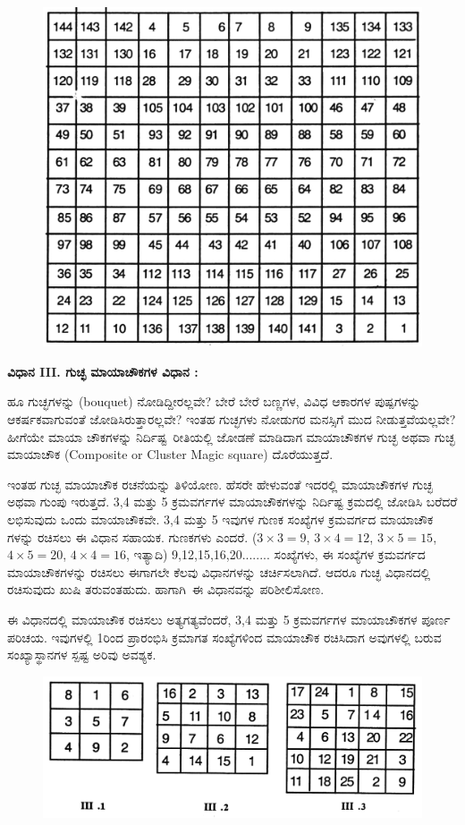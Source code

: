 \begin{figure}[H]
\includegraphics{src/figures/chap3/fig3-29.jpg}
\end{figure}

\noindent \textbf{ವಿಧಾನ III. ಗುಚ್ಛ ಮಾಯಾಚೌಕಗಳ ವಿಧಾನ :}

\medskip
ಹೂ ಗುಚ್ಛಗಳನ್ನು (bouquet) ನೋಡಿದ್ದೀರಲ್ಲವೇ? ಬೇರೆ ಬೇರೆ ಬಣ್ಣಗಳ, ವಿವಿಧ ಆಕಾರಗಳ ಪುಷ್ಪಗಳನ್ನು ಆಕರ್ಷಕವಾಗುವಂತೆ ಜೋಡಿಸಿರುತ್ತಾರಲ್ಲವೇ? ಇಂತಹ ಗುಚ್ಛ\-ಗಳು ನೋಡುಗರ ಮನಸ್ಸಿಗೆ ಮುದ ನೀಡುತ್ತವೆಯಲ್ಲವೇ? ಹೀಗೆಯೇ ಮಾಯಾ ಚೌಕಗಳನ್ನು \hbox{ನಿರ್ದಿಷ್ಟ ರೀತಿಯಲ್ಲಿ} ಜೋಡಣೆ ಮಾಡಿದಾಗ ಮಾಯಾಚೌಕಗಳ ಗುಚ್ಛ ಅಥವಾ ಗುಚ್ಛ ಮಾಯಾ\-ಚೌಕ (Composite or Cluster Magic square) ದೊರೆಯುತ್ತದೆ.

\medskip
ಇಂತಹ ಗುಚ್ಛ ಮಾಯಾಚೌಕ ರಚನೆಯನ್ನು ತಿಳಿಯೋಣ. ಹೆಸರೇ ಹೇಳುವಂತೆ ಇದರಲ್ಲಿ ಮಾಯಾಚೌಕಗಳ ಗುಚ್ಛ ಅಥವಾ ಗುಂಪು ಇರುತ್ತದೆ. 3,4 ಮತ್ತು 5 ಕ್ರಮವರ್ಗಗಳ ಮಾಯಾಚೌಕಗಳನ್ನು ನಿರ್ದಿಷ್ಟ ಕ್ರಮದಲ್ಲಿ ಜೋಡಿಸಿ ಬರೆದರೆ ಲಭಿಸುವುದು ಒಂದು ಮಾಯಾಚೌಕವೇ. 3,4 ಮತ್ತು 5 ಇವುಗಳ ಗುಣಕ ಸಂಖ್ಯೆಗಳ ಕ್ರಮವರ್ಗದ ಮಾಯಾಚೌಕ ಗಳನ್ನು ರಚಿಸಲು ಈ ವಿಧಾನ ಸಹಾಯಕ. ಗುಣಕಗಳು ಎಂದರೆ. ($3 \times 3=9$, $3 \times 4=12$, $3 \times 5=15$, $4 \times 5= 20$, $4 \times 4=16$, ಇತ್ಯಾದಿ) 9,12,15,16,20........ ಸಂಖ್ಯೆಗಳು, ಈ ಸಂಖ್ಯೆಗಳ ಕ್ರಮವರ್ಗದ ಮಾಯಾಚೌಕಗಳನ್ನು ರಚಿಸಲು ಈಗಾಗಲೇ ಕೆಲವು ವಿಧಾನಗಳನ್ನು ಚರ್ಚಿಸಲಾಗಿದೆ. ಆದರೂ ಗುಚ್ಛ ವಿಧಾನದಲ್ಲಿ ರಚಿಸುವುದು ಖುಷಿ ತರುವಂತಹುದು. \hbox{ಹಾಗಾಗಿ ಈ} ವಿಧಾನವನ್ನು ಪರಿಶೀಲಿಸೋಣ.

\medskip
ಈ ವಿಧಾನದಲ್ಲಿ ಮಾಯಾಚೌಕ ರಚಿಸಲು ಅತ್ಯಗತ್ಯವೆಂದರೆ, 3,4 ಮತ್ತು 5 ಕ್ರಮ\-ವರ್ಗಗಳ ಮಾಯಾಚೌಕಗಳ ಪೂರ್ಣ ಪರಿಚಯ. ಇವುಗಳಲ್ಲಿ 1ರಿಂದ ಪ್ರಾರಂಭಿಸಿ ಕ್ರಮಾಗತ ಸಂಖ್ಯೆ\-ಗಳಿಂದ ಮಾಯಾಚೌಕ ರಚಿಸಿದಾಗ ಅವುಗಳಲ್ಲಿ ಬರುವ ಸಂಖ್ಯಾಸ್ಥಾನಗಳ ಸ್ಪಷ್ಟ ಅರಿವು ಅವಶ್ಯಕ.
\begin{figure}[H]
\includegraphics[scale=1.1]{src/figures/chap3/fig3-30.jpg}
\end{figure}
\eject

